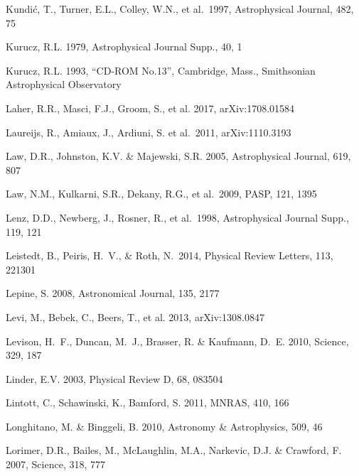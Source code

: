 \documentclass[twocolumn]{aastex61}
\begin{document}
\begin{thebibliography}{}
 Kundi\'{c}, T., Turner, E.L., Colley, W.N., et al.~1997, Astrophysical Journal, 482, 75

 Kurucz, R.L. 1979, Astrophysical Journal Supp., 40, 1

 Kurucz, R.L. 1993, ``CD-ROM No.13'', Cambridge, Mass., Smithsonian Astrophysical Observatory

 Laher, R.R., Masci, F.J., Groom, S., et al. 2017, arXiv:1708.01584

 Laureijs, R., Amiaux, J., Ardiuni, S. et al.~2011, arXiv:1110.3193

 Law, D.R., Johnston, K.V. \& Majewski, S.R. 2005,  Astrophysical Journal, 619, 807

 Law, N.M., Kulkarni, S.R., Dekany, R.G., et al.~2009, PASP, 121, 1395

 Lenz, D.D., Newberg, J., Rosner, R., et al.~1998, Astrophysical Journal Supp., 119, 121

 Leistedt, B., Peiris, H.~V., \& Roth, N.\ 2014, Physical Review Letters, 113, 221301

 Lepine, S. 2008, Astronomical Journal, 135, 2177

 Levi, M., Bebek, C., Beers, T., et al. 2013, arXiv:1308.0847

 Levison, H.~F., Duncan, M.~J., Brasser, R. \& Kaufmann, D.~E. 2010, Science, 329, 187

 Linder, E.V. 2003, Physical Review D, 68, 083504

 Lintott, C., Schawinski, K., Bamford, S. 2011, MNRAS, 410, 166

 Longhitano, M. \& Binggeli, B. 2010, Astronomy \& Astrophysics, 509, 46

 Lorimer, D.R., Bailes, M., McLaughlin, M.A., Narkevic, D.J. \& Crawford, F. 2007, Science, 318, 777


\end{thebibliography}
\end{document}
